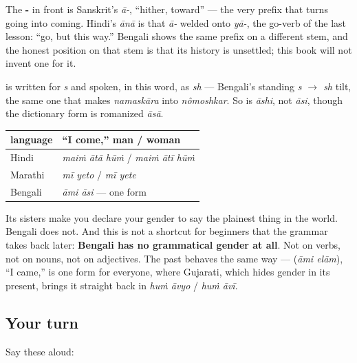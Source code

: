 \begin{cousinweb}
The \textbf{-} in front is Sanskrit's \emph{ā-}, \textquotedblleft{}hither, toward\textquotedblright{} — the very prefix that turns going into coming. Hindi's \emph{ānā} is that \emph{ā-} welded onto \emph{yā-}, the go-verb of the last lesson: \textquotedblleft{}go, but this way.\textquotedblright{} Bengali shows the same prefix on a different stem, and the honest position on that stem is that its history is unsettled; this book will not invent one for it.
\end{cousinweb}

\begin{sounds}
\textbf{} is written for \emph{s} and spoken, in this word, as \emph{sh} — Bengali's standing \emph{s $\to$ sh} tilt, the same one that makes \emph{namaskāra} into \emph{nômoshkar}. So  is \emph{āshi}, not \emph{āsi}, though the dictionary form is romanized \emph{āsā}.
\end{sounds}

\begin{grammarlens}[title={Grammar Lens: no gender, not here, not anywhere}]
\noindent
\begin{tabularx}{\linewidth}{@{}>{\raggedright\arraybackslash}X>{\raggedright\arraybackslash}X@{}}
\toprule
\textbf{language} & \textbf{\textquotedblleft{}I come,\textquotedblright{} man / woman} \\
\midrule
Hindi & \emph{maiṁ ātā hūṁ} / \emph{maiṁ ātī hūṁ} \\
Marathi & \emph{mī yeto} / \emph{mī yete} \\
Bengali & \emph{āmi āsi} — one form \\
\bottomrule
\end{tabularx}

Its sisters make you declare your gender to say the plainest thing in the world. Bengali does not. And this is not a shortcut for beginners that the grammar takes back later: \textbf{Bengali has no grammatical gender at all}. Not on verbs, not on nouns, not on adjectives. The past behaves the same way —   (\emph{āmi elām}), \textquotedblleft{}I came,\textquotedblright{} is one form for everyone, where Gujarati, which hides gender in its present, brings it straight back in \emph{huṁ āvyo} / \emph{huṁ āvī}.
\end{grammarlens}

\subsection*{Your turn}
Say these aloud:

